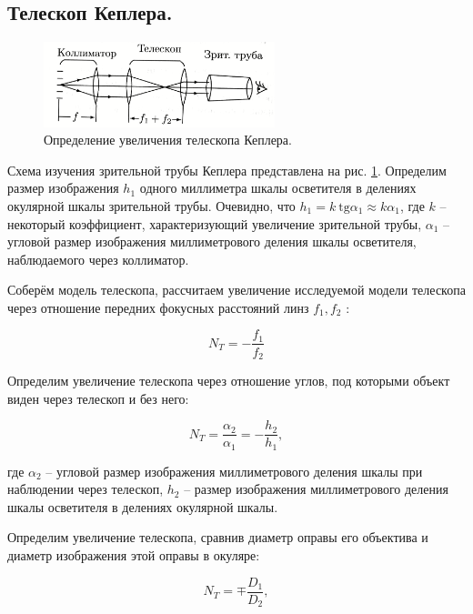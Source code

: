 \documentclass[a4paper, 12pt, twoside]{article}
\begin{document}
	\subsection{Телескоп Кеплера.}
	\label{theor}
	\begin{figure}[H]
		\centering
		\includegraphics[width =  0.6\textwidth]{img3}
		\caption{Определение увеличения телескопа Кеплера.}
		\label{img3}
	\end{figure}
	
	Схема изучения зрительной трубы Кеплера представлена на рис. \ref{img3}. Определим размер изображения $h_1$ одного миллиметра шкалы осветителя в делениях окулярной шкалы зрительной трубы. Очевидно, что $h_1 = k ~ \mathrm{tg} \alpha_1 \approx k\alpha_1$, где $k$ -- некоторый коэффициент, характеризующий увеличение зрительной трубы, $\alpha_1$ -- угловой размер изображения миллиметрового деления шкалы осветителя, наблюдаемого через коллиматор.
	
	Соберём модель телескопа, рассчитаем увеличение исследуемой модели телескопа через отношение передних фокусных расстояний линз $f_1, f_2$ :
	
	\begin{equation}
		N_T = -\dfrac{f_1}{f_2}
	\end{equation}
	
	Определим увеличение телескопа через отношение углов, под которыми объект виден через телескоп и без него:
	
	\begin{equation}
	N_T = \dfrac{\alpha_2}{\alpha_1} = - \dfrac{h_2}{h_1},
	\end{equation}
	
	где $\alpha_2$ -- угловой размер изображения миллиметрового деления шкалы при наблюдении через телескоп, $h_2$ -- размер изображения миллиметрового деления шкалы осветителя в делениях окулярной шкалы.
	
	
	Определим увеличение телескопа, сравнив диаметр оправы его объектива и диаметр изображения этой оправы в окуляре:
	
	\begin{equation}
	N_T = \mp \dfrac{D_1}{D_2},
	\end{equation}
	
\end{document}
